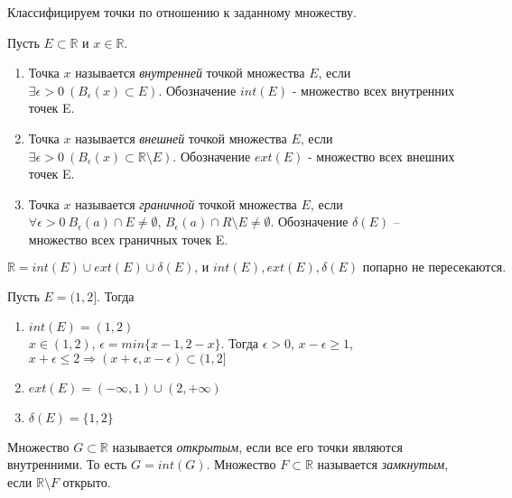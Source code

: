     Классифицируем точки по отношению к заданному множеству.
    
    \begin{definition}
        Пусть $E \subset \mathds{R}$ и $x \in \mathds{R}$.
        \begin{enumerate}
            \item Точка $x$ называется \textit{внутренней} точкой множества $E$, если $\exists \epsilon > 0 \ (B_{\epsilon}(x) \subset E)$. Обозначение $int(E)$ - множество всех внутренних точек E.
            \item Точка $x$ называется \textit{внешней} точкой множества $E$, если $\exists \epsilon > 0 \ (B_{\epsilon}(x) \subset \mathds{R} \setminus E)$. Обозначение $ext(E)$ - множество всех внешних точек E.
            \item Точка $x$ называется \textit{граничной} точкой множества $E$, если $\forall \epsilon > 0 \ B_{\epsilon}(a) \cap E \neq \emptyset$, $B_{\epsilon}(a) \cap R \setminus E \neq \emptyset$. Обозначение $\delta(E)$ -- множество всех граничных точек E.
        \end{enumerate}
    \end{definition}
    
    \begin{note}
        \[\mathds{R} = int(E) \cup ext(E) \cup \delta(E) \text{, и } int(E), ext(E), \delta(E) \text{ попарно не пересекаются.}\]
    \end{note}
    
    \begin{example}
        Пусть $E = (1, 2]$. Тогда
        \begin{enumerate}
            \item $int(E) = (1, 2)$
            \\
            $x \in (1, 2)$, $\epsilon = min\{x - 1, 2 - x\}$. Тогда $\epsilon > 0$, $x - \epsilon \geq 1$, $x + \epsilon \leq 2 \Rightarrow (x + \epsilon, x - \epsilon) \subset (1, 2]$
            \item $ext(E) = (-\infty, 1) \cup (2, +\infty)$
            \item $\delta(E) = \{1, 2\}$
        \end{enumerate}
    \end{example}
    
    \begin{definition}
        Множество $G \subset \mathds{R}$ называется \textit{открытым}, если все его точки являются внутренними. То есть $G = int(G)$.
        Множество $F \subset \mathds{R}$ называется \textit{замкнутым}, если $\mathds{R} \setminus F$ открыто.
    \end{definition}
    
